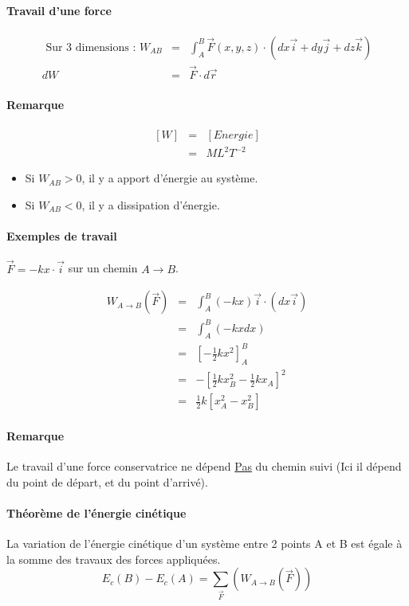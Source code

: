 \paragraph{Travail d'une force}

\[\begin{array}{rcl}
		\text{ Sur 3 dimensions : }	W_{AB} &=& \int_A^B\vec{F}(x, y, z) \cdot (dx\vec{i}+dy\vec{j}+dz\vec{k}) \\
		dW &=& \vec{F}\cdot d\vec{r}
\end{array}\]

\paragraph{Remarque}
\[\begin{array}{rcl}
		{[W]} &=& {[Energie]} \\
			   &=& ML^2T^{-2}\end{array}\]

\begin{itemize}
	\item Si $W_{AB} > 0$, il y a apport d'énergie au système.
	\item Si $W_{AB} < 0$, il y a dissipation d'énergie.
\end{itemize}

\paragraph{Exemples de travail}

$\vec{F} = -kx\cdot \vec{i}$ sur un chemin $A \rightarrow B$.

\[\begin{array}{rcl}
		W_{A\to B}(\vec{F}) &=& \int_A^B(-kx)\vec{i} \cdot (dx\vec{i}) \\
							 &=& \int_A^B(-kxdx) \\
							&=& [-\frac{1}{2}kx^2]^B_A \\
							&=& -[\frac{1}{2}kx^2_B - \frac{1}{2}kx_A]^2 \\
				   &=& \frac{1}{2}k[x_A^2 - x^2_B]
\end{array}\]

\paragraph{Remarque} Le travail d'une force conservatrice ne dépend \ul{Pas} du chemin suivi (Ici il dépend du point de départ, et du point d'arrivé).

\paragraph{Théorème de l'énergie cinétique} La variation de l'énergie cinétique d'un système entre 2 points A et B est égale à la somme des travaux des forces appliquées.
\[E_c(B) - E_c(A) = \sum_{\vec{F}} (W_{A \to B}(\vec{F}))\]
